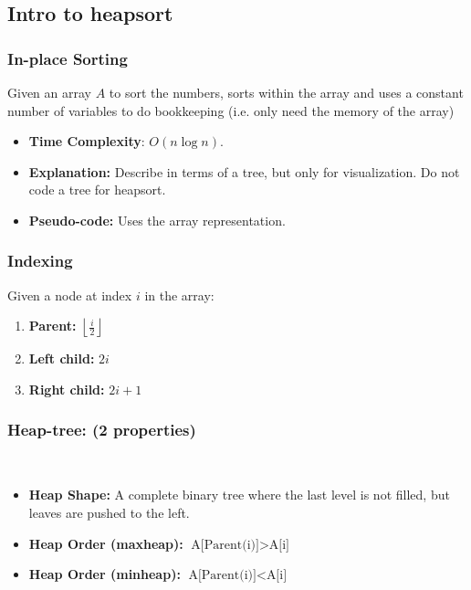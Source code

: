 \subsection{Intro to heapsort}
    \subsubsection{In-place Sorting}
    \begin{definition}
        Given an array \( A \) to sort the numbers, sorts within the array and uses a constant number of variables to do bookkeeping (i.e. only need the memory of the array)
        \begin{itemize}
            \item \textbf{Time Complexity}: \( O(n \log n) \).
            \item \textbf{Explanation:} Describe in terms of a tree, but only for visualization. Do not code a tree for heapsort.
            \item \textbf{Pseudo-code:} Uses the array representation.
        \end{itemize}
    \end{definition}


    \subsubsection{Indexing}
    \begin{definition}
        Given a node at index $i$ in the array:

        \begin{enumerate}
            \item \textbf{Parent:} $\left \lfloor \frac{i}{2} \right \rfloor$
            \item \textbf{Left child:} $2i$
            \item \textbf{Right child:} $2i+1$
        \end{enumerate}
    \end{definition}

    \subsubsection{Heap-tree: (2 properties)}\
    \begin{definition}
        \begin{itemize}
            \item \textbf{Heap Shape:} A complete binary tree where the last level is not filled, but leaves are pushed to the left.
            \item \textbf{Heap Order (maxheap):} $\text{A[Parent(i)]} > \text{A[i]}$
            \item \textbf{Heap Order (minheap):} $\text{A[Parent(i)]} < \text{A[i]}$
        \end{itemize}
    \end{definition}

